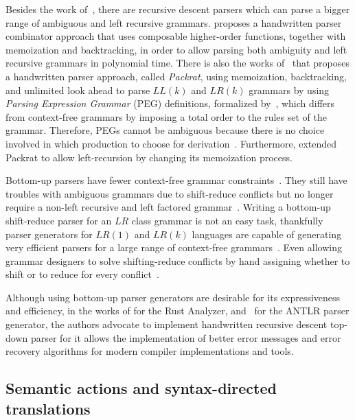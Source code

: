 \documentclass[
  oneside,
  english,
  coorientadorbanca,
  noabntexcite
]{ufsc-thesis-rn46-2019}
\begin{document}
Besides the work of~\textcite{pratt1973operatorprecedence}, there are recursive descent parsers which can parse a bigger range of ambiguous and left recursive grammars.
\textcite{10.1007/978-3-540-77442-6_12} proposes a handwritten parser combinator approach that uses composable higher-order functions, together with memoization and backtracking, in order to allow parsing both ambiguity and left recursive grammars in polynomial time.
There is also the works of~\textcite{10.1145/583852.581483} that proposes a handwritten parser approach, called \textit{Packrat}, using memoization, backtracking, and unlimited look ahead to parse $LL(k)$ and $LR(k)$ grammars by using \textit{Parsing Expression Grammar} (PEG) definitions, formalized by~\textcite{10.1145/982962.964011}, which differs from context-free grammars by imposing a total order to the rules set of the grammar.
Therefore, PEGs cannot be ambiguous because there is no choice involved in which production to choose for derivation~\cite{10.1145/982962.964011}.
Furthermore, \textcite{10.1145/1328408.1328424} extended Packrat to allow left-recursion by changing its memoization process.

Bottom-up parsers have fewer context-free grammar constraints~\cite{Aho:2006:CPT:1177220}.
They still have troubles with ambiguous grammars due to shift-reduce conflicts but no longer require a non-left recursive and left factored grammar~\cite{Aho:2006:CPT:1177220}.
Writing a bottom-up shift-reduce parser for an $LR$ class grammar is not an easy task, thankfully
parser generators for $LR(1)$ and $LR(k)$ languages are capable of generating very efficient parsers for a large range of context-free grammars~\cite{Aho:2006:CPT:1177220}.
Even allowing grammar designers to solve shifting-reduce conflicts by hand assigning whether to shift or to reduce for every conflict~\cite{Aho:2006:CPT:1177220}.

Although using bottom-up parser generators are desirable for its expressiveness and efficiency, in the works of \textcite{matklad2020challenginglrparsing, matklad2020prattparsing} for the Rust Analyzer, and~\textcite{Parr13} for the ANTLR parser generator, the authors advocate to implement handwritten recursive descent top-down parser for it allows the implementation of better error messages and error recovery algorithms for modern compiler implementations and tools.

\subsection{Semantic actions and syntax-directed translations}
\end{document}
